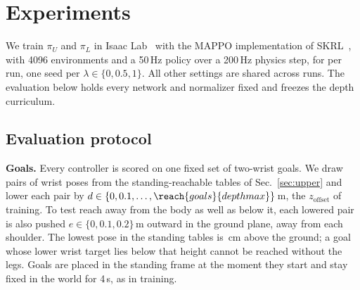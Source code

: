 %
%                         

\section{Experiments}
\label{sec:experiments}

We train $\pi_U$ and $\pi_L$ in Isaac Lab~\cite{mittal2025isaaclab} with the MAPPO implementation of
SKRL~\cite{serrano2023skrl}, with 4096 environments and a 50\,Hz policy over a 200\,Hz physics step, for
 per run, one seed per $\lambda \in \{0, 0.5, 1\}$. All other settings are shared across
runs. The evaluation below holds every network and normalizer fixed and freezes the depth curriculum.

\subsection{Evaluation protocol}
\label{sec:protocol}

\textbf{Goals.} Every controller is scored on one fixed set of  two-wrist goals. We draw
 pairs of wrist poses from the standing-reachable tables of Sec.~\ref{sec:upper} and lower each
pair by $d \in \{0, 0.1, \dots, \reach{goals}{depthmax}\}$\,m, the $z_{\mathrm{offset}}$ of training. To test reach away from
the body as well as below it, each lowered pair is also pushed $e \in \{0, 0.1, 0.2\}$\,m outward in the ground
plane, away from each shoulder. The lowest pose in the standing tables is \,cm above the
ground; a goal whose lower wrist target lies below that height cannot be reached without the legs. Goals are placed
in the standing frame at the moment they start and stay fixed in the world for 4\,s, as in training.


